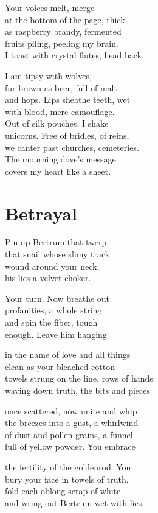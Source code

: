 \documentclass[twoside,10pt]{book}
\begin{document}
Your voices melt, merge\\
at the bottom of the page, thick\\
as raspberry brandy, fermented\\
fruits piling, peeling my brain.\\
I toast with crystal flutes, head back.

I am tipsy with wolves,\\
fur brown as beer, full of malt\\
and hops. Lips sheathe teeth, wet\\
with blood, mere camouflage.\\
Out of silk pouches, I shake\\
unicorns. Free of bridles, of reins,\\
we canter past churches, cemeteries.\\
The mourning dove's message\\
covers my heart like a sheet.

\clearpage
\section{Betrayal}

Pin up Bertrum that twerp\\
that snail whose slimy track\\
wound around your neck,\\
his lies a velvet choker.

Your turn. Now breathe out\\
profanities, a whole string\\
and spin the fiber, tough\\
enough. Leave him hanging

in the name of love and all things\\
clean as your bleached cotton\\
towels strung on the line, rows of hands\\
waving down truth, the bits and pieces

once scattered, now unite and whip\\
the breezes into a gust, a whirlwind\\
of dust and pollen grains, a funnel\\
full of yellow powder. You embrace

the fertility of the goldenrod. You\\
bury your face in towels of truth,\\
fold each oblong scrap of white\\
and wring out Bertrum wet with lies.
\end{document}
